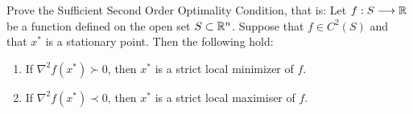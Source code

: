 \documentclass{ExerciseSheet}
\newif\ifsolutions
\begin{document}
\vskip 0.5cm
\begin{exo}
	Prove the Sufficient Second Order Optimality Condition, that is:
Let $f: S \longrightarrow \mathbb{R}$ be a function defined on the open set $S\subset \mathbb{R}^n$. Suppose that $f \in C^2(S)$ and that $x^*$ is a stationary point. Then the following hold:
\begin{enumerate}
    \item If $\nabla^2 f(x^*) \succ 0$, then $x^*$ is a strict local minimizer of $f$.
    \item  If $\nabla^2 f(x^*) \prec 0$, then $x^*$ is a strict local maximiser of $f$.
\end{enumerate}
\end{exo}

\ifsolutions
\vskip 0.3cm
\begin{solution}
\begin{enumerate}
    \item Let $x^*\neq x\in S,$ assume $\nabla^2 f(x^*) \succ 0.$ Let us prove that $x^*$ is a strict local minimizer of $f$ over $S$ that is 
\begin{align*}
    f(x)>f(x^*) \text{ for all $x\in S$ and $x\neq x^*$}.
\end{align*}
There exists $r>0,$ such that $B(x^*, r)\subseteq S$ for which $\nabla^2 f(x) \succ 0$ for all $x\in B(x^*, r)$   as the Hessian is continuous since $f \in C^2(S).$ Moreover, applying the linear approximation theorem yields for all $x\in B(x^*, r)$ there exists $z\in [x^* , x]$ such that %
\begin{align*}
    f(x) = f(x^*) + \nabla f(x^*)^T(x-x^*) + \frac{1}{2}(x-x^*)^T\nabla^2 f(z)(x-x^*)
\end{align*}
Since $x^*$ is a stationary point of $f,$ then $\nabla f(x^*)=0,$ it follows that, 
  \begin{align*}
    f(x) - f(x^*) =  \frac{1}{2}(x-x^*)^T\nabla^2 f(z)(x-x^*).
\end{align*}
in addition, $z\in [x^* , x]\subseteq B(x^*, r)$ hence, $\nabla^2 f(z) \succ 0.$ Since $x\neq x^*,$ it follows  $$(x-x^*)^T\nabla^2 f(z)(x-x^*)>0$$
therefore,
  \begin{align*}
      f(x) > f(x^*) \text{ for all $x\in B(x^*, r)$}.
  \end{align*}
\item Apply the same argument on $-f.$
\end{enumerate}
\end{solution} 
\fi
\end{document}
